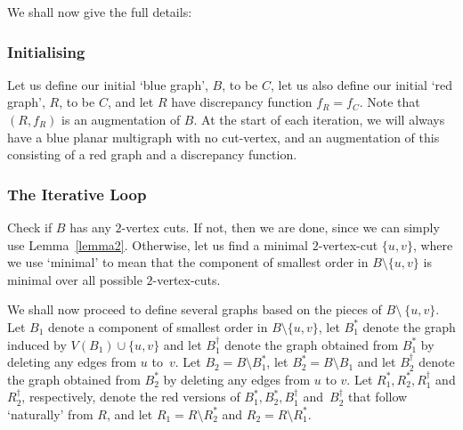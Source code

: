 \documentclass{article}
\newtheorem{Proof of Theorem}{Proof of Theorem}
\begin{document}
We shall now give the full details:





\subsubsection*{Initialising} 





Let us define our initial `blue graph', $B$, to be $C$,
let us also define our initial `red graph', $R$, to be $C$,
and let $R$ have discrepancy function $f_{R}=f_{C}$.
Note that $(R,f_{R})$ is an augmentation of $B$.
At the start of each iteration,
we will always have a blue planar multigraph with no cut-vertex,
and an augmentation of this consisting of a red graph and a discrepancy function. 





\subsubsection*{The Iterative Loop} 





Check if $B$ has any $2$-vertex cuts.
If not,
then we are done, 
since we can simply use Lemma~\ref{lemma2}.
Otherwise, let us find a minimal $2$-vertex-cut $\{ u,v \}$,
where we use `minimal' to mean that the component of smallest order in $B \setminus \{ u,v \}$ is minimal
over all possible $2$-vertex-cuts.

We shall now proceed to define several graphs based on the pieces of $B \setminus~\{ u,v \}$.
Let $B_{1}$ denote a component of smallest order in $B \setminus \{ u,v \}$,
let $B_{1}^{*}$ denote the graph induced by $V(B_{1}) \cup \{ u,v \}$
and let $B_{1}^{\dag}$ denote the graph obtained from $B_{1}^{*}$ by deleting any edges from $u$ to~$v$.
Let $B_{2} = B \setminus B_{1}^{*}$,
let $B_{2}^{*} = B \setminus B_{1}$
and let $B_{2}^{\dag}$ denote the graph obtained from $B_{2}^{*}$ by deleting any edges from $u$ to $v$.
Let $R_{1}^{*},R_{2}^{*},R_{1}^{\dag}$ and $R_{2}^{\dag}$,
respectively,
denote the red versions of $B_{1}^{*},B_{2}^{*},B_{1}^{\dag}$ and~$B_{2}^{\dag}$
that follow `naturally' from $R$,
and let $R_{1} = R \setminus R_{2}^{*}$
and $R_{2} = R \setminus R_{1}^{*}$.
\end{document}
